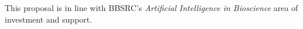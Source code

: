 This proposal is in line with BBSRC's \emph{Artificial Intelligence in
Bioscience} area of investment and support.
